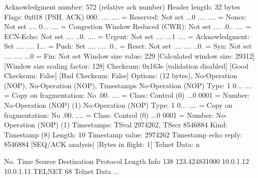     Acknowledgment number: 572    (relative ack number)
    Header length: 32 bytes
    Flags: 0x018 (PSH, ACK)
        000. .... .... = Reserved: Not set
        ...0 .... .... = Nonce: Not set
        .... 0... .... = Congestion Window Reduced (CWR): Not set
        .... .0.. .... = ECN-Echo: Not set
        .... ..0. .... = Urgent: Not set
        .... ...1 .... = Acknowledgment: Set
        .... .... 1... = Push: Set
        .... .... .0.. = Reset: Not set
        .... .... ..0. = Syn: Not set
        .... .... ...0 = Fin: Not set
    Window size value: 229
    [Calculated window size: 29312]
    [Window size scaling factor: 128]
    Checksum: 0x163e [validation disabled]
        [Good Checksum: False]
        [Bad Checksum: False]
    Options: (12 bytes), No-Operation (NOP), No-Operation (NOP), Timestamps
        No-Operation (NOP)
            Type: 1
                0... .... = Copy on fragmentation: No
                .00. .... = Class: Control (0)
                ...0 0001 = Number: No-Operation (NOP) (1)
        No-Operation (NOP)
            Type: 1
                0... .... = Copy on fragmentation: No
                .00. .... = Class: Control (0)
                ...0 0001 = Number: No-Operation (NOP) (1)
        Timestamps: TSval 2974262, TSecr 8546884
            Kind: Timestamp (8)
            Length: 10
            Timestamp value: 2974262
            Timestamp echo reply: 8546884
    [SEQ/ACK analysis]
        [Bytes in flight: 1]
Telnet
    Data: n

No.     Time           Source                Destination           Protocol Length Info
    138 123.424831000  10.0.1.12             10.0.1.11             TELNET   68     Telnet Data ...

